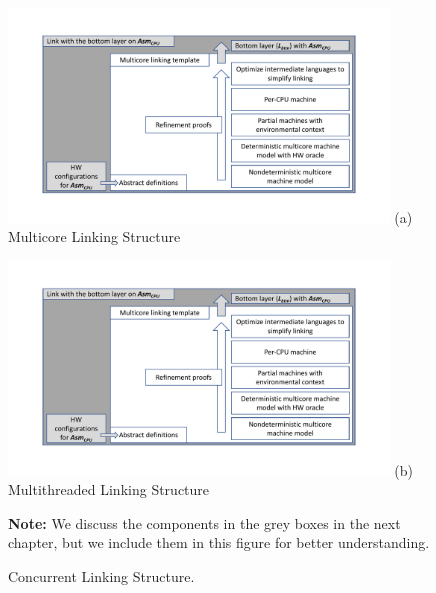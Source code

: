 \begin{figure}
\begin{center}
\includegraphics[width=0.9\textwidth, page=1]{figs/conlink/overview}\newline
(a) Multicore Linking Structure
\end{center}
\begin{center}
\includegraphics[width=0.9\textwidth, page=2]{figs/conlink/overview}\newline
(b) Multithreaded Linking Structure
\end{center}
\textbf{Note:} We discuss the components in the grey boxes  in the next chapter, but we include them in this figure for better understanding.
\caption{Concurrent Linking Structure.}
\label{fig:chapter:conlink:concurrent-linking-structure}
\end{figure}

